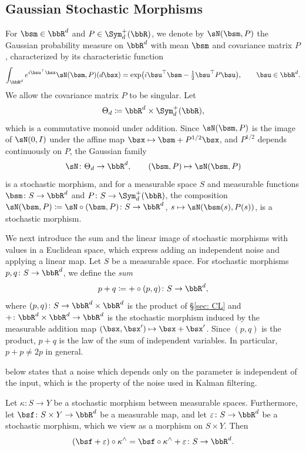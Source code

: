\documentclass[12pt,reqno]{amsart}%
\theoremstyle{plain}
\theoremstyle{definition}
\def\R{\bbR}
\begin{document}
%
\subsection{Gaussian Stochastic Morphisms}
%

For $\bsm\in\R^d$ and $P\in\Sym^+_d(\R)$, we denote by $\sN(\bsm,P)$ the Gaussian probability measure on $\R^d$
with mean $\bsm$ and covariance matrix $P$, characterized by its characteristic function
\begin{equation}\label{eq: char}
	\int_{\R^d}e^{i\bsu^{\top}\bsx}\sN(\bsm,P)(d\bsx)=\exp\bigl(i\bsu^{\top}\bsm-\tfrac12\bsu^{\top}P\bsu\bigr),\qquad \bsu\in\R^d.
\end{equation}
We allow the covariance matrix $P$ to be singular.
Let
\[
	\Theta_d\coloneqq\R^d\times\Sym^+_d(\R),
\]
which is a commutative monoid under addition.
Since $\sN(\bsm,P)$ is the image of $\sN(0,I)$ under the affine map $\bsx\mapsto\bsm+P^{1/2}\bsx$,
and $P^{1/2}$ depends continuously on $P$, the Gaussian family
\[
	\sN\colon\Theta_d\rightarrow\R^d,\qquad(\bsm,P)\mapsto\sN(\bsm,P)
\]
is a stochastic morphism, and for a measurable space $S$ and measurable functions
$\bsm\colon S\rightarrow\R^d$ and $P\colon S\rightarrow\Sym^+_d(\R)$,
the composition $\sN(\bsm,P)\coloneqq\sN\circ(\bsm,P)\colon S\rightarrow\R^d$, $s\mapsto\sN(\bsm(s),P(s))$,
is a stochastic morphism.

We next introduce the sum and the linear image of stochastic morphisms with values in a Euclidean space,
which express adding an independent noise and applying a linear map.
Let $S$ be a measurable space.
For stochastic morphisms $p,q\colon S\rightarrow\R^d$, we define the \emph{sum}
\[
	p+q\coloneqq{+}\circ(p,q)\colon S\rightarrow\R^d,
\]
where $(p,q)\colon S\rightarrow\R^d\times\R^d$ is the product of \S\ref{sec: CL}
and ${+}\colon\R^d\times\R^d\rightarrow\R^d$ is the stochastic morphism induced by the measurable
addition map $(\bsx,\bsx')\mapsto\bsx+\bsx'$.
Since $(p,q)$ is the product, $p+q$ is the law of the sum of independent variables.
In particular, $p+p\neq2p$ in general.

 below states that a noise which depends only on the parameter is independent of the input,
which is the property of the noise used in Kalman filtering.


\begin{lemma}\label{lem: sum}
	Let $\kappa\colon S\rightarrow Y$ be a stochastic morphism between measurable spaces.
	Furthermore, let $\bsf\colon S\times Y\rightarrow\R^d$ be a measurable map, and let
	$\varepsilon\colon S\rightarrow\R^d$ be a stochastic morphism,
	which we view as a morphism on $S\times Y$.
	Then
	\[
		(\bsf+\varepsilon)\circ\kappa^\wedge=\bsf\circ\kappa^\wedge+\varepsilon\colon S\rightarrow\R^d.
	\]
\end{lemma}
\end{document}
